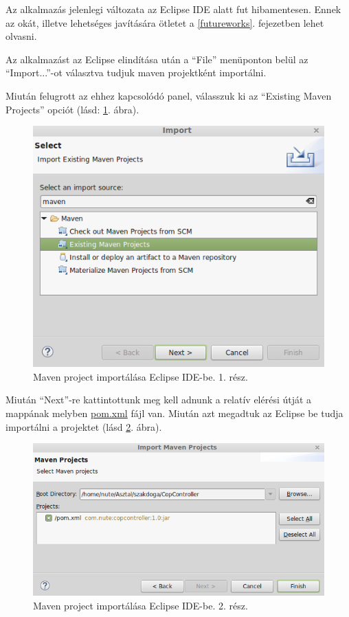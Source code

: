 \documentclass[a4paper,12pt]{report}
\begin{document}
Az alkalmazás jelenlegi változata az Eclipse IDE alatt fut hibamentesen. Ennek az okát, illetve lehetséges javítására ötletet a \ref{futureworks}. fejezetben lehet olvasni. 

\vspace{2mm}
Az alkalmazást az Eclipse elindítása után a ``File'' menüponton belül az ``Import...''-ot választva tudjuk maven projektként importálni.

\vspace{2mm}
Miután felugrott az ehhez kapcsolódó panel, válasszuk ki az ``Existing Maven Projects'' opciót (lásd: \ref{importmaven1}. ábra).

\begin{figure}[ht]
\centerline{
\includegraphics[width=5in]{img/importmavenproject}}
\caption{Maven project importálása Eclipse IDE-be. 1. rész.}
\label{importmaven1}
\end{figure}

\vspace{2mm}
Miután ``Next''-re kattintottunk meg kell adnunk a relatív elérési útját a mappának melyben \url{pom.xml} fájl van. Miután azt megadtuk az Eclipse be tudja importálni a projektet (lásd \ref{importmaven2}. ábra).

\begin{figure}[ht]
\centerline{
\includegraphics[width=5in]{img/importmavenproject2}}
\caption{Maven project importálása Eclipse IDE-be. 2. rész.}
\label{importmaven2}
\end{figure}
\end{document}
